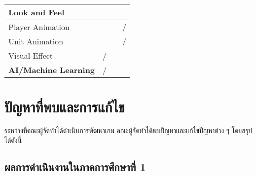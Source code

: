 \documentclass[12pt,oneside,openright,a4paper]{cpe-thai-project}
\begin{document}
\begin{table}[H]
\begin{tabular}{|lllc|}
  \multicolumn{4}{|l|}{\textbf{Look and Feel}}                                                                                                                                                                                                                      \\ \hline
  \multicolumn{1}{|l|}{Player Animation}            & \multicolumn{1}{l|}{}                                                                       & \multicolumn{1}{l|}{}                                                                   & /                     \\ \hline
  \multicolumn{1}{|l|}{Unit Animation}              & \multicolumn{1}{l|}{}                                                                       & \multicolumn{1}{l|}{}                                                                   & /                     \\ \hline
  \multicolumn{1}{|l|}{Visual Effect}               & \multicolumn{1}{c|}{/}                                                                      & \multicolumn{1}{l|}{}                                                                   & \multicolumn{1}{l|}{} \\ \hline
  \multicolumn{1}{|l|}{\textbf{AI/Machine Learning}} & \multicolumn{1}{c|}{/}                                                                      & \multicolumn{1}{l|}{}                                                                   & \multicolumn{1}{l|}{} \\ \hline
  \end{tabular}
  \end{table}

\pagebreak
\section{ปัญหาที่พบและการแก้ไข}
ระหว่างที่คณะผู้จัดทำได้ดำเนินการพัฒนาเกม คณะผู้จัดทำได้พบปัญหาและแก้ไขปัญหาต่าง ๆ โดยสรุปได้ดังนี้

  \subsection{ผลการดำเนินงานในภาคการศึกษาที่ 1} 
\end{document}
